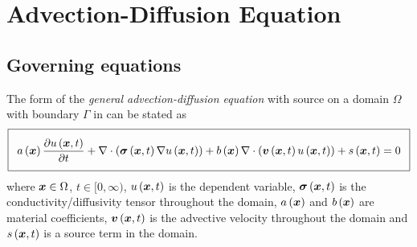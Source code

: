 \section{Advection-Diffusion Equation} 

\subsection{Governing equations}

The form of the \emph{general advection-diffusion equation} with source on a domain $\Omega$ with boundary
$\Gamma$ in \OpenCMISS can be stated as
\begin{equation}
  \addtolength{\fboxsep}{5pt}
  \boxed{
    \fnof{a}{\vectr{x}}\delby{\fnof{u}{\vectr{x},t}}{t}+\divergence{}{\pbrac{\fnof{\tensor{\sigma}}{\vectr{x},t}
        \gradient{}{\fnof{u}{\vectr{x},t}}}}+\fnof{b}{\vectr{x}}\divergence{}{\pbrac{\fnof{\vectr{v}}{\vectr{x},t}
        \fnof{u}{\vectr{x},t}}}+\fnof{s}{\vectr{x},t}=0
  }
  \label{eqn:GeneralAdvectionDiffusionEquation}
\end{equation}
where $\boldsymbol{x}\in\Omega$, $t\in[0,\infty)$, $ u\left( \boldsymbol{x},t \right) $ is the
  dependent variable, $ \boldsymbol{\mathit{\sigma}}\left( \boldsymbol{x},t \right) $ is the
  conductivity/diffusivity tensor throughout the domain, $ a\left( \boldsymbol{x} \right) $
  and $ b\left( \boldsymbol{x} \right) $ are material coefficients,
  $ \boldsymbol{v}\left( \boldsymbol{x},t \right) $ is the advective velocity throughout the
  domain and $ s\left( \boldsymbol{x},t \right) $ is a source term in the domain.

